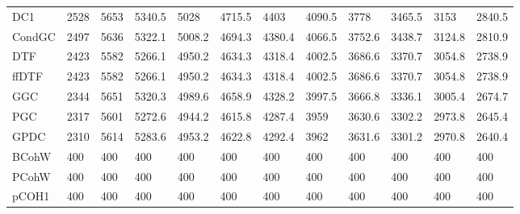 \begin{table}[ht]
\begin{tabular}{llllllllllll}
  DC1 & 2528 & 5653 & 5340.5 & 5028 & 4715.5 & 4403 & 4090.5 & 3778 & 3465.5 & 3153 & 2840.5 \\ 
  CondGC & 2497 & 5636 & 5322.1 & 5008.2 & 4694.3 & 4380.4 & 4066.5 & 3752.6 & 3438.7 & 3124.8 & 2810.9 \\ 
  DTF & 2423 & 5582 & 5266.1 & 4950.2 & 4634.3 & 4318.4 & 4002.5 & 3686.6 & 3370.7 & 3054.8 & 2738.9 \\ 
  ffDTF & 2423 & 5582 & 5266.1 & 4950.2 & 4634.3 & 4318.4 & 4002.5 & 3686.6 & 3370.7 & 3054.8 & 2738.9 \\ 
  GGC & 2344 & 5651 & 5320.3 & 4989.6 & 4658.9 & 4328.2 & 3997.5 & 3666.8 & 3336.1 & 3005.4 & 2674.7 \\ 
  PGC & 2317 & 5601 & 5272.6 & 4944.2 & 4615.8 & 4287.4 & 3959 & 3630.6 & 3302.2 & 2973.8 & 2645.4 \\ 
  GPDC & 2310 & 5614 & 5283.6 & 4953.2 & 4622.8 & 4292.4 & 3962 & 3631.6 & 3301.2 & 2970.8 & 2640.4 \\ 
  BCohW & 400 & 400 & 400 & 400 & 400 & 400 & 400 & 400 & 400 & 400 & 400 \\ 
  PCohW & 400 & 400 & 400 & 400 & 400 & 400 & 400 & 400 & 400 & 400 & 400 \\ 
  pCOH1 & 400 & 400 & 400 & 400 & 400 & 400 & 400 & 400 & 400 & 400 & 400 \\ 
   \hline
\end{tabular}
\end{table}
